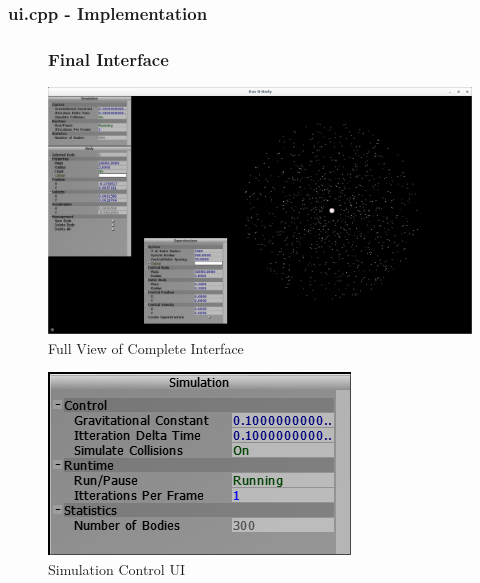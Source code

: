 \subsubsection{ui.cpp - Implementation}
\texttt{} 
\begin{figure}
  \subsubsection{Final Interface}
  \centering
  \includegraphics[width=\textwidth]{../img/finalInterface.png} 
  \caption{Full View of Complete Interface}
\end{figure}
\pagebreak

\begin{figure}[h]
  \centering
  \includegraphics[scale=0.7]{../img/simUI.png} 
  \caption{Simulation Control UI}
\end{figure}

